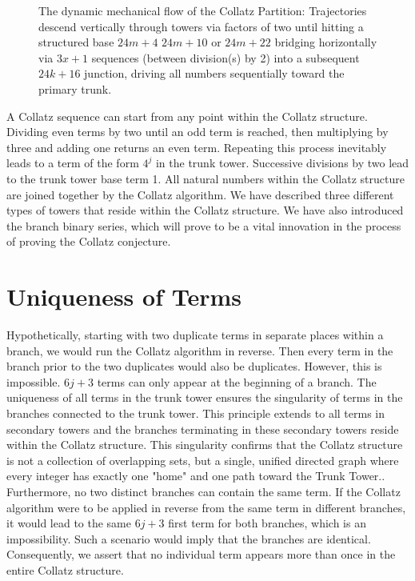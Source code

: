 \documentclass[sn-mathphys-num, pdflatex]{sn-jnl}
\begin{document}
\begin{figure}[ht!]
    \caption{The dynamic mechanical flow of the Collatz Partition: Trajectories descend vertically through towers via factors of two until hitting a structured base $24m+4$ $24m+10$ or $24m+22$ bridging horizontally via $3x+1$ sequences (between division(s) by 2) into a subsequent $24k+16$ junction, driving all numbers sequentially toward the primary trunk.}
    \label{fig1}
\end{figure}

A Collatz sequence can start from any point within the Collatz structure. Dividing even terms by two until an odd term is reached, then multiplying by three and adding one returns an even term. Repeating this process inevitably leads to a term of the form $4^j$ in the trunk tower. Successive divisions by two lead to the trunk tower base term 1. All natural numbers within the Collatz structure are joined together by the Collatz algorithm. We have described three different types of towers that reside within the Collatz structure. We have also introduced the branch binary series, which will prove to be a vital innovation in the process of proving the Collatz conjecture. 

\section{Uniqueness of Terms}\label{sec3}
Hypothetically, starting with two duplicate terms in separate places within a branch, we would run the Collatz algorithm in reverse. Then every term in the branch prior to the two duplicates would also be duplicates. However, this is impossible. $6j+3$ terms can only appear at the beginning of a branch. The uniqueness of all terms in the trunk tower ensures the singularity of terms in the branches connected to the trunk tower. This principle extends to all terms in secondary towers and the branches terminating in these secondary towers reside within the Collatz structure. This singularity confirms that the Collatz structure is not a collection of overlapping sets, but a single, unified directed graph where every integer has exactly one "home" and one path toward the Trunk Tower.. Furthermore, no two distinct branches can contain the same term. If the Collatz algorithm were to be applied in reverse from the same term in different branches, it would lead to the same $6j+3$ first term for both branches, which is an impossibility. Such a scenario would imply that the branches are identical. Consequently, we assert that no individual term appears more than once in the entire Collatz structure. 
\end{document}

